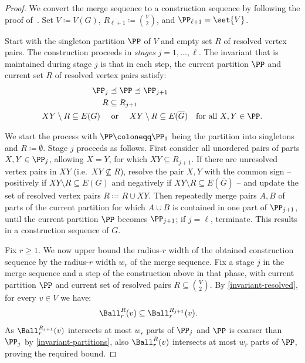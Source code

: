 \begin{proof}
We convert the merge sequence to a construction sequence by following the proof of~\cite[Lemma~3.3]{mw-arxiv}. Set $V\coloneqq V(G)$, $R_{\ell+1}\coloneqq {V\choose 2}$, and $\PP_{\ell+1}=\set{V}$.

Start with the singleton partition $\PP$ of $V$ and empty set $R$ of resolved vertex pairs.
The construction proceeds in \emph{stages} $j=1,\ldots,\ell$.
The invariant that is maintained during stage $j$ is that in each step, the current partition $\PP$ and current set $R$ of resolved vertex pairs satisfy:
\begin{align}\label{invariant-partitions}
    \PP_j&\preceq \PP\preceq \PP_{j+1}\qquad\\ R&\subseteq R_{j+1}\label{invariant-resolved}\\
    XY\setminus R\subseteq E(G)\quad&\text{ or }\quad XY\setminus R\subseteq E(\overline G)\quad\text{for all $X,Y\in \PP$}.
\end{align}

We start the process with $\PP \coloneqq \PP_1$ being the partition into singletons and $R \coloneqq \emptyset$.
Stage
$j$ proceeds as follows. First consider all unordered pairs of parts
$X,Y\in\PP_{j}$, allowing $X=Y$, for which
$XY\subseteq R_{j+1}$.
If there are unresolved vertex pairs in $XY$ (i.e.\ $XY\nsubseteq R$), resolve the pair $X,Y$
with the common sign -- positively if $XY\setminus R\subseteq E(G)$ and negatively if $XY\setminus R\subseteq E(\overline G)$ -- and update the set of resolved vertex pairs $R\coloneqq R\cup XY$.
Then repeatedly merge pairs $A,B$ of parts of the current partition for which $A\cup B$ is contained in one part of $\PP_{j+1}$, until the current partition $\PP$ becomes $\PP_{j+1}$; if $j=\ell$, terminate. This results in a construction sequence of $G$.

Fix $r\geq 1$.
We now upper bound the radius-$r$ width of the obtained construction sequence by the radius-$r$ width $w_r$ of the merge sequence.
Fix a stage $j$ in the merge sequence and a step
of the construction above in that phase, with current partition $\PP$ and current set of resolved pairs $R\subseteq {V\choose 2}$. By \eqref{invariant-resolved}, for every $v\in V$ we have:
\begin{align}\label{ball-inc}
    \Ball_r^{R}(v)&\subseteq \Ball_r^{R_{j+1}}(v).
\end{align}
As $\Ball_r^{R_{j+1}}(v)$ intersects at most $w_r$ parts of $\PP_j$ and $\PP$ is coarser than $\PP_j$ by \eqref{invariant-partitions},
also $\Ball_r^{R}(v)$ intersects at most $w_r$ parts of $\PP$, proving the required bound.


\end{proof}
